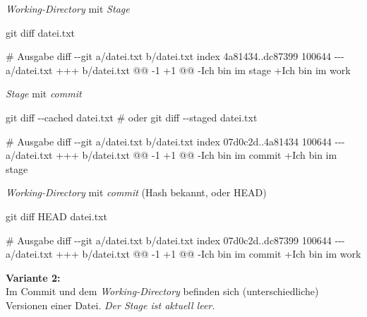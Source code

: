 \documentclass[
  ngerman,
  letterpaper,
  DIV=11]{scrreprt}
\newenvironment{Shaded}{\begin{snugshade}}{\end{snugshade}}
\newcommand{\AttributeTok}[1]{\textcolor[rgb]{0.40,0.45,0.13}{#1}}
\newcommand{\CommentTok}[1]{\textcolor[rgb]{0.37,0.37,0.37}{#1}}
\newcommand{\ExtensionTok}[1]{\textcolor[rgb]{0.00,0.23,0.31}{#1}}
\newcommand{\FunctionTok}[1]{\textcolor[rgb]{0.28,0.35,0.67}{#1}}
\newcommand{\NormalTok}[1]{\textcolor[rgb]{0.00,0.23,0.31}{#1}}
\newcommand{\stage}{\textit{Stage}\xspace}
\newcommand{\work}{\textit{Working-Directory}\xspace}
\begin{document}
\work mit \stage   

\begin{Shaded}
\begin{Highlighting}[]
\FunctionTok{git}\NormalTok{ diff datei.txt}

\CommentTok{\# Ausgabe}
\FunctionTok{diff} \AttributeTok{{-}{-}git}\NormalTok{ a/datei.txt b/datei.txt}
\ExtensionTok{index}\NormalTok{ 4a81434..dc87399 100644}
\ExtensionTok{{-}{-}{-}}\NormalTok{ a/datei.txt}
\ExtensionTok{+++}\NormalTok{ b/datei.txt}
\ExtensionTok{@@} \AttributeTok{{-}1}\NormalTok{ +1 @@}
\ExtensionTok{{-}Ich}\NormalTok{ bin im stage}
\ExtensionTok{+Ich}\NormalTok{ bin im work}
\end{Highlighting}
\end{Shaded}

\stage mit \emph{commit}

\begin{Shaded}
\begin{Highlighting}[]
\FunctionTok{git}\NormalTok{ diff }\AttributeTok{{-}{-}cached}\NormalTok{ datei.txt}
\CommentTok{\# oder git diff {-}{-}staged datei.txt }

\CommentTok{\# Ausgabe}
\FunctionTok{diff} \AttributeTok{{-}{-}git}\NormalTok{ a/datei.txt b/datei.txt}
\ExtensionTok{index}\NormalTok{ 07d0c2d..4a81434 100644}
\ExtensionTok{{-}{-}{-}}\NormalTok{ a/datei.txt}
\ExtensionTok{+++}\NormalTok{ b/datei.txt}
\ExtensionTok{@@} \AttributeTok{{-}1}\NormalTok{ +1 @@}
\ExtensionTok{{-}Ich}\NormalTok{ bin im commit}
\ExtensionTok{+Ich}\NormalTok{ bin im stage}
\end{Highlighting}
\end{Shaded}

\work mit \emph{commit} (Hash bekannt, oder HEAD)

\begin{Shaded}
\begin{Highlighting}[]
\FunctionTok{git}\NormalTok{ diff HEAD datei.txt}

\CommentTok{\# Ausgabe}
\FunctionTok{diff} \AttributeTok{{-}{-}git}\NormalTok{ a/datei.txt b/datei.txt}
\ExtensionTok{index}\NormalTok{ 07d0c2d..dc87399 100644}
\ExtensionTok{{-}{-}{-}}\NormalTok{ a/datei.txt}
\ExtensionTok{+++}\NormalTok{ b/datei.txt}
\ExtensionTok{@@} \AttributeTok{{-}1}\NormalTok{ +1 @@}
\ExtensionTok{{-}Ich}\NormalTok{ bin im commit}
\ExtensionTok{+Ich}\NormalTok{ bin im work}
\end{Highlighting}
\end{Shaded}

\textbf{Variante 2:}\\
Im Commit und dem \work  befinden sich (unterschiedliche) Versionen
einer Datei. \emph{Der Stage ist aktuell leer.}
\end{document}
